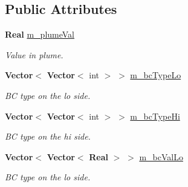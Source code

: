 \subsection*{Public Attributes}
\begin{DoxyCompactItemize}
\item 
\mbox{\label{class_basic_porosity_permeability_face_b_c_function_aa1d072b0f7a83cee89f8c74800724f2f}} 
\textbf{ Real} \hyperlink{class_basic_porosity_permeability_face_b_c_function_aa1d072b0f7a83cee89f8c74800724f2f}{m\+\_\+plume\+Val}
\begin{DoxyCompactList}\small\item\em Value in plume. \end{DoxyCompactList}\item 
\mbox{\label{class_basic_porosity_permeability_face_b_c_function_adf25634e67df48830f18ddd5c2aab692}} 
\textbf{ Vector}$<$ \textbf{ Vector}$<$ int $>$ $>$ \hyperlink{class_basic_porosity_permeability_face_b_c_function_adf25634e67df48830f18ddd5c2aab692}{m\+\_\+bc\+Type\+Lo}
\begin{DoxyCompactList}\small\item\em BC type on the lo side. \end{DoxyCompactList}\item 
\mbox{\label{class_basic_porosity_permeability_face_b_c_function_a14bc35227bde0f362318c3089918d728}} 
\textbf{ Vector}$<$ \textbf{ Vector}$<$ int $>$ $>$ \hyperlink{class_basic_porosity_permeability_face_b_c_function_a14bc35227bde0f362318c3089918d728}{m\+\_\+bc\+Type\+Hi}
\begin{DoxyCompactList}\small\item\em BC type on the hi side. \end{DoxyCompactList}\item 
\mbox{\label{class_basic_porosity_permeability_face_b_c_function_afb2fb410e5dbcd33748fd5085c2fb0d4}} 
\textbf{ Vector}$<$ \textbf{ Vector}$<$ \textbf{ Real} $>$ $>$ \hyperlink{class_basic_porosity_permeability_face_b_c_function_afb2fb410e5dbcd33748fd5085c2fb0d4}{m\+\_\+bc\+Val\+Lo}
\begin{DoxyCompactList}\small\item\em BC type on the lo side. \end{DoxyCompactList}\item 

\end{DoxyCompactItemize}
